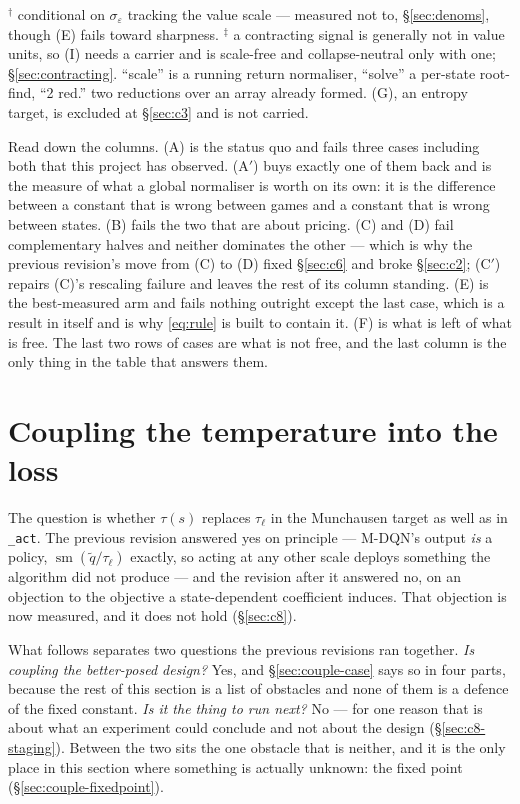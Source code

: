 \documentclass{article}
\DeclareMathOperator{\sm}{sm}
\newcommand{\snoise}{\sigma_{\varepsilon}}
\begin{document}
$^\dagger$ conditional on $\snoise$ tracking the value scale --- measured not to,
\S\ref{sec:denoms}, though (E) fails toward sharpness. $^\ddagger$ a contracting signal is
generally not in value units, so (I) needs a carrier and is scale-free and collapse-neutral only
with one; \S\ref{sec:contracting}. ``scale'' is a running return normaliser, ``solve'' a
per-state root-find, ``2 red.'' two reductions over an array already formed. (G), an entropy
target, is excluded at \S\ref{sec:c3} and is not carried.

Read down the columns. (A) is the status quo and fails three cases including both that this
project has observed. (A$'$) buys exactly one of them back and is the measure of what a global
normaliser is worth on its own: it is the difference between a constant that is wrong between
games and a constant that is wrong between states. (B) fails the two that are about pricing.
(C) and (D) fail complementary halves and neither dominates the other --- which is why the
previous revision's move from (C) to (D) fixed \S\ref{sec:c6} and broke \S\ref{sec:c2}; (C$'$)
repairs (C)'s rescaling failure and leaves the rest of its column standing. (E) is the
best-measured arm and fails nothing outright except the last case, which is a result in itself
and is why \eqref{eq:rule} is built to contain it. (F) is what is left of what is free. The last
two rows of cases are what is not free, and the last column is the only thing in the table that
answers them.

\section{Coupling the temperature into the loss}
\label{sec:decouple}

The question is whether $\tau(s)$ replaces $\tau_\ell$ in the Munchausen target as well as in
\texttt{\_act}. The previous revision answered yes on principle --- M-DQN's output \emph{is} a
policy, $\sm(\tilde{q}/\tau_\ell)$ exactly, so acting at any other scale deploys something the
algorithm did not produce --- and the revision after it answered no, on an objection to the
objective a state-dependent coefficient induces. That objection is now measured, and it does not
hold (\S\ref{sec:c8}).

What follows separates two questions the previous revisions ran together. \emph{Is coupling the
better-posed design?} Yes, and \S\ref{sec:couple-case} says so in four parts, because the rest of
this section is a list of obstacles and none of them is a defence of the fixed constant.
\emph{Is it the thing to run next?} No --- for one reason that is about what an experiment could
conclude and not about the design (\S\ref{sec:c8-staging}). Between the two sits the one obstacle
that is neither, and it is the only place in this section where something is actually unknown:
the fixed point (\S\ref{sec:couple-fixedpoint}).
\end{document}

